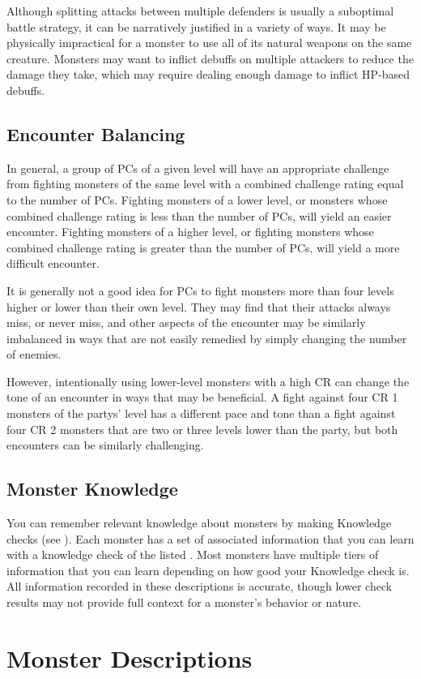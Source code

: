         Although splitting attacks between multiple defenders is usually a suboptimal battle strategy, it can be narratively justified in a variety of ways.
        It may be physically impractical for a monster to use all of its natural weapons on the same creature.
        Monsters may want to inflict debuffs on multiple attackers to reduce the damage they take, which may require dealing enough damage to inflict HP-based debuffs.

    \subsection{Encounter Balancing}\label{Encounter Balancing}
        In general, a group of PCs of a given level will have an appropriate challenge from fighting monsters of the same level with a combined challenge rating equal to the number of PCs.
        Fighting monsters of a lower level, or monsters whose combined challenge rating is less than the number of PCs, will yield an easier encounter.
        Fighting monsters of a higher level, or fighting monsters whose combined challenge rating is greater than the number of PCs, will yield a more difficult encounter.

        It is generally not a good idea for PCs to fight monsters more than four levels higher or lower than their own level.
        They may find that their attacks always miss, or never miss, and other aspects of the encounter may be similarly imbalanced in ways that are not easily remedied by simply changing the number of enemies.

        However, intentionally using lower-level monsters with a high CR can change the tone of an encounter in ways that may be beneficial.
        A fight against four CR 1 monsters of the partys' level has a different pace and tone than a fight against four CR 2 monsters that are two or three levels lower than the party, but both encounters can be similarly challenging.

    \subsection{Monster Knowledge}
        You can remember relevant knowledge about monsters by making Knowledge checks (see ).
        Each monster has a set of associated information that you can learn with a knowledge check of the listed .
        Most monsters have multiple tiers of information that you can learn depending on how good your Knowledge check is.
        All information recorded in these descriptions is accurate, though lower check results may not provide full context for a monster's behavior or nature.

\section{Monster Descriptions}


